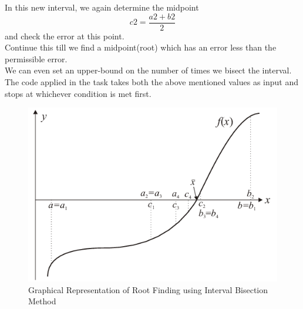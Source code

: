 \documentclass[11pt]{article}
\begin{document}
In this new interval, we again determine the midpoint \[c2 = \frac{a2+b2}{2}\] and check the error at this point. \\

Continue this till we find a midpoint(root) which has an error less than the permissible error.\\
We can even set an upper-bound on the number of times we bisect the interval.\\

The code applied in the task takes both the above mentioned values as input and stops at whichever condition is met first.


\begin{figure} [h!]
	\centering
		\centering
		\includegraphics[width=0.5\linewidth]{bsm1}
		\caption{Graphical Representation of Root Finding using Interval Bisection Method}
		\label{fig1}
\end{figure}
\end{document}
